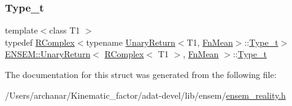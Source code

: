 \mbox{\label{structENSEM_1_1UnaryReturn_3_01RComplex_3_01T1_01_4_00_01FnMean_01_4_a36f90d415b22308c1707a2639a538763}} 
\subsubsection{\texorpdfstring{Type\_t}{Type\_t}\hspace{0.1cm}{\footnotesize\ttfamily [3/3]}}
{\footnotesize\ttfamily template$<$class T1 $>$ \\
typedef \mbox{\hyperlink{classENSEM_1_1RComplex}{R\+Complex}}$<$typename \mbox{\hyperlink{structENSEM_1_1UnaryReturn}{Unary\+Return}}$<$T1, \mbox{\hyperlink{structENSEM_1_1FnMean}{Fn\+Mean}}$>$\+::\mbox{\hyperlink{structENSEM_1_1UnaryReturn_3_01RComplex_3_01T1_01_4_00_01FnMean_01_4_a36f90d415b22308c1707a2639a538763}{Type\+\_\+t}}$>$ \mbox{\hyperlink{structENSEM_1_1UnaryReturn}{E\+N\+S\+E\+M\+::\+Unary\+Return}}$<$ \mbox{\hyperlink{classENSEM_1_1RComplex}{R\+Complex}}$<$ T1 $>$, \mbox{\hyperlink{structENSEM_1_1FnMean}{Fn\+Mean}} $>$\+::\mbox{\hyperlink{structENSEM_1_1UnaryReturn_3_01RComplex_3_01T1_01_4_00_01FnMean_01_4_a36f90d415b22308c1707a2639a538763}{Type\+\_\+t}}}



The documentation for this struct was generated from the following file\+:\begin{DoxyCompactItemize}
\item 
/\+Users/archanar/\+Kinematic\+\_\+factor/adat-\/devel/lib/ensem/\mbox{\hyperlink{adat-devel_2lib_2ensem_2ensem__reality_8h}{ensem\+\_\+reality.\+h}}\end{DoxyCompactItemize}
